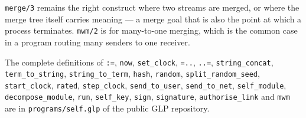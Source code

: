 \verb|merge/3| remains the right construct where two streams are merged, or where the merge tree itself carries meaning --- a merge goal that is also the point at which a process terminates. \verb|mwm/2| is for many-to-one merging, which is the common case in a program routing many senders to one receiver.

The complete definitions of \verb|:=|, \verb|now|, \verb|set_clock|, \verb|=..|, \verb|..=|, \verb|string_concat|, \verb|term_to_string|, \verb|string_to_term|, \verb|hash|, \verb|random|, \verb|split_random_seed|, \verb|start_clock|, \verb|rated|, \verb|step_clock|, \verb|send_to_user|, \verb|send_to_net|, \verb|self_module|, \verb|decompose_module|, \verb|run|, \verb|self_key|, \verb|sign|, \verb|signature|, \verb|authorise_link| and \verb|mwm| are in \verb|programs/self.glp| of the public GLP repository.


